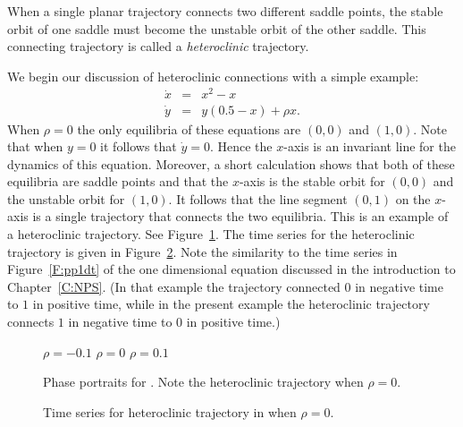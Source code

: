 \documentclass{ximera}
\begin{document}
When a single planar trajectory connects two different saddle points, the 
stable orbit of one saddle must become the unstable orbit of the other 
saddle.  This connecting trajectory is called a {\em heteroclinic\/} 
trajectory.

We begin our discussion of heteroclinic connections with a simple example:
\begin{equation*} \label{e:hetero}
\begin{array}{rcl}
\dot{x} & = &  x^2-x  \\
\dot{y} & = &  y(0.5-x) + \rho x.
\end{array}
\end{equation*}
When $\rho=0$ the only equilibria of these equations are $(0,0)$ and 
$(1,0)$.  Note that when $y=0$ it follows that $\dot{y}=0$.  Hence
the $x$-axis is an invariant line for the dynamics of this equation. 
Moreover, a short calculation shows that both of these equilibria are 
saddle points and that the $x$-axis is the stable orbit for $(0,0)$
and the unstable orbit for $(1,0)$.  
It follows that the line segment 
$(0,1)$ on the $x$-axis is a single trajectory that connects the two
equilibria.  This is an example of a heteroclinic trajectory. See
Figure~\ref{F:hetero}.  The time series for the heteroclinic trajectory 
is given in Figure~\ref{F:heteroT}.  Note the similarity to the time 
series in Figure~\ref{F:pp1dt} of the one dimensional equation 
 discussed in the introduction to Chapter~\ref{C:NPS}. (In 
that example the trajectory connected $0$ in negative time to $1$ in positive
time, while in the present example the heteroclinic trajectory connects
$1$ in negative time to $0$ in positive time.)

\begin{figure}[htb]
           \centerline{%
	   }
 	\vspace*{-0.2in}
	\hspace{0.3in} $\rho=-0.1$  \hspace{1.7in} $\rho=0$
		\hspace{1.8in} $\rho=0.1$ 
           \caption{Phase portraits for \protect{}. 
	Note the heteroclinic trajectory when $\rho=0$.}
           \label{F:hetero}
\end{figure}

\begin{figure}[htb]
           \centerline{%
	   }
           \caption{Time series for heteroclinic trajectory 
		in \protect{} when $\rho=0$.}
           \label{F:heteroT}
\end{figure}
\end{document}

